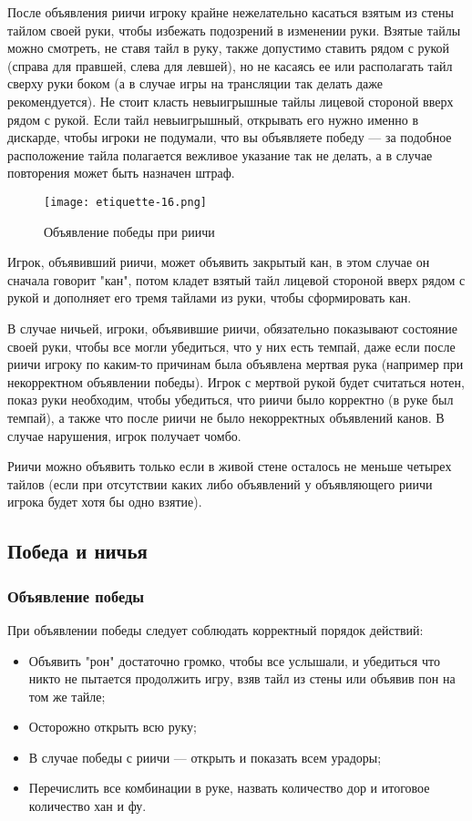 После объявления риичи игроку крайне нежелательно касаться взятым из стены тайлом своей руки, чтобы избежать подозрений в изменении руки. Взятые тайлы можно смотреть, не ставя тайл в руку, также допустимо ставить рядом с рукой (справа для правшей, слева для левшей), но не касаясь ее или располагать тайл сверху руки боком (а в случае игры на трансляции так делать даже рекомендуется). Не стоит класть невыигрышные тайлы лицевой стороной вверх рядом с рукой. Если тайл невыигрышный, открывать его нужно именно в дискарде, чтобы игроки не подумали, что вы объявляете победу --- за подобное расположение тайла полагается вежливое указание так не делать, а в случае повторения может быть назначен штраф.

\begin{figure}[H]
	\centering
	\texttt{[image: etiquette-16.png]}
	\caption{Объявление победы при риичи}
\end{figure}

Игрок, объявивший риичи, может объявить закрытый кан, в этом случае он сначала говорит "кан", потом кладет взятый тайл лицевой стороной вверх рядом с рукой и дополняет его тремя тайлами из руки, чтобы сформировать кан.

В случае ничьей, игроки, объявившие риичи, обязательно показывают состояние своей руки, чтобы все могли убедиться, что у них есть темпай, даже если после риичи игроку по каким-то причинам была объявлена мертвая рука (например при некорректном объявлении победы). Игрок с мертвой рукой будет считаться нотен, показ руки необходим, чтобы убедиться, что риичи было корректно (в руке был темпай), а также что после риичи не было некорректных объявлений канов. В случае нарушения, игрок получает чомбо.

Риичи можно объявить только если в живой стене осталось не меньше четырех тайлов (если при отсутствии каких либо объявлений у объявляющего риичи игрока будет хотя бы одно взятие). 

\subsection{Победа и ничья}

\subsubsection{Объявление победы}

При объявлении победы следует соблюдать корректный порядок действий:

\begin{itemize}
	\item Объявить "рон" достаточно громко, чтобы все услышали, и убедиться что никто не пытается продолжить игру, взяв тайл из стены или объявив пон на том же тайле;
	\item Осторожно открыть всю руку;
	\item В случае победы с риичи --- открыть и показать всем урадоры;
	\item Перечислить все комбинации в руке, назвать количество дор и итоговое количество хан и фу.
\end{itemize}

